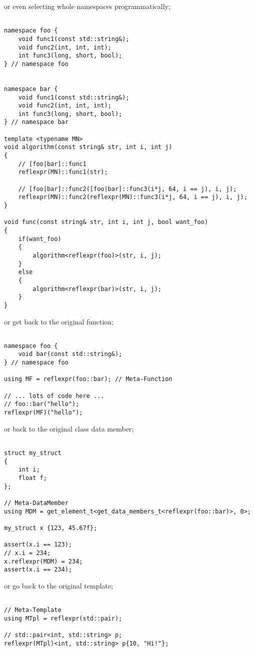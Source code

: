 or even selecting whole namespaces programmatically;

\begin{verbatim}

namespace foo {
	void func1(const std::string&);
	void func2(int, int, int);
	int func3(long, short, bool);
} // namespace foo


namespace bar {
	void func1(const std::string&);
	void func2(int, int, int);
	int func3(long, short, bool);
} // namespace bar

template <typename MN>
void algorithm(const string& str, int i, int j)
{
	// [foo|bar]::func1
	reflexpr(MN)::func1(str);

	// [foo|bar]::func2([foo|bar]::func3(i*j, 64, i == j), i, j);
	reflexpr(MN)::func2(reflexpr(MN)::func3(i*j, 64, i == j), i, j);
}

void func(const string& str, int i, int j, bool want_foo)
{
	if(want_foo)
	{
		algorithm<reflexpr(foo)>(str, i, j);
	}
	else 
	{
		algorithm<reflexpr(bar)>(str, i, j);
	}
}

\end{verbatim}

or get back to the original function;

\begin{verbatim}

namespace foo {
	void bar(const std::string&);
} // namespace foo

using MF = reflexpr(foo::bar); // Meta-Function

// ... lots of code here ...
// foo::bar("hello");
reflexpr(MF)("hello");

\end{verbatim}

or back to the original class data member;

\begin{verbatim}

struct my_struct
{
	int i;
	float f;
};

// Meta-DataMember
using MDM = get_element_t<get_data_members_t<reflexpr(foo::bar)>, 0>;

my_struct x {123, 45.67f};

assert(x.i == 123);
// x.i = 234;
x.reflexpr(MDM) = 234;
assert(x.i == 234);

\end{verbatim}

or go back to the original template;

\begin{verbatim}

// Meta-Template
using MTpl = reflexpr(std::pair);

// std::pair<int, std::string> p;
reflexpr(MTpl)<int, std::string> p{10, "Hi!"};

\end{verbatim}

